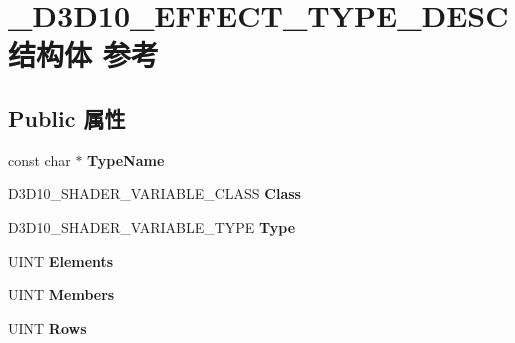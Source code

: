 \hypertarget{struct___d3_d10___e_f_f_e_c_t___t_y_p_e___d_e_s_c}{}\section{\+\_\+\+D3\+D10\+\_\+\+E\+F\+F\+E\+C\+T\+\_\+\+T\+Y\+P\+E\+\_\+\+D\+E\+S\+C结构体 参考}
\label{struct___d3_d10___e_f_f_e_c_t___t_y_p_e___d_e_s_c}
\subsection*{Public 属性}
\begin{DoxyCompactItemize}
\item 
\mbox{\label{struct___d3_d10___e_f_f_e_c_t___t_y_p_e___d_e_s_c_aae6ca63dc5d500ae9b102b48d73a289e}} 
const char $\ast$ {\bfseries Type\+Name}
\item 
\mbox{\label{struct___d3_d10___e_f_f_e_c_t___t_y_p_e___d_e_s_c_a5088af7aef600e57efc52f4ddb918591}} 
D3\+D10\+\_\+\+S\+H\+A\+D\+E\+R\+\_\+\+V\+A\+R\+I\+A\+B\+L\+E\+\_\+\+C\+L\+A\+SS {\bfseries Class}
\item 
\mbox{\label{struct___d3_d10___e_f_f_e_c_t___t_y_p_e___d_e_s_c_a03bd78f6a7eda53d2ab7874bac14df30}} 
D3\+D10\+\_\+\+S\+H\+A\+D\+E\+R\+\_\+\+V\+A\+R\+I\+A\+B\+L\+E\+\_\+\+T\+Y\+PE {\bfseries Type}
\item 
\mbox{\label{struct___d3_d10___e_f_f_e_c_t___t_y_p_e___d_e_s_c_a097ea2387e6d40f7856a08221a0ef876}} 
U\+I\+NT {\bfseries Elements}
\item 
\mbox{\label{struct___d3_d10___e_f_f_e_c_t___t_y_p_e___d_e_s_c_a3b6c5dac6a70ad91cf45d143761d2a97}} 
U\+I\+NT {\bfseries Members}
\item 
\mbox{\label{struct___d3_d10___e_f_f_e_c_t___t_y_p_e___d_e_s_c_a3fb50d1f8a40daeac420121d181167c2}} 
U\+I\+NT {\bfseries Rows}
\item 

\end{DoxyCompactItemize}
